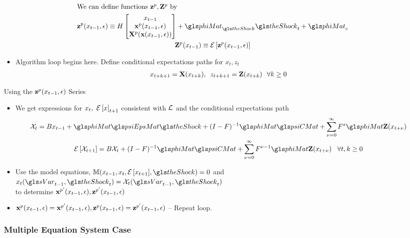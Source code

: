 \documentclass[12pt]{article}
\begin{document}
\begin{gather*}
 \intertext{We can define functions $\zpWOarg,\ZpWOarg$ by}
\zpWarg\equiv H
\begin{bmatrix}
x_{t-1}\\ \xpWarg\\ \XpWOarg(\xWarg)
\end{bmatrix}+\phiMat_\theShock \theShock_t+\phiMat_c\\
\ZpWOarg(x_{t-1})\equiv \expct{\zpWarg}
\end{gather*}
 \begin{itemize}
\item  {\color{blue}Algorithm loop begins here.} Define conditional expectations paths for $x_t, z_t$ 
 \begin{gather*}
 x_{t+k+1}=\mathbf{X}(x_{t+k}),\,\,\,z_{t+k+1}=\mathbf{Z}(x_{t+k})\,\,\,\,  \forall k\ge 0      \end{gather*}
   \end{itemize}

{Using the $\mathbf{z}^p(x_{t-1},\epsilon)$ Series}
{\small
  \begin{itemize}
  \item We get expressions for $x_t,\,\, {\mathcal{E}\left [ x \right ]}_{t+1}$ consistent with ${\mathcal{L}}$ and the conditional expectations path
   \begin{gather*}
     \mathcal{X}_{t} =B x_{t-1}+ \phiMat \psiEpsMat\theShock + (I - F)^{-1} \phiMat \psiCMat + \sum_{\sForSum=0}^\infty F^s \phiMat \ZWOarg(x_{t+\nu})\\
	\expct{ \mathcal{X}_{t+1}} =B \mathcal{X}_{t}  + (I - F)^{-1} \phiMat \psiCMat+ \sum_{\sForSum =0}^\infty F^{\sForSum-1} \phiMat \ZWOarg(x_{t+\nu}) \,\,\,\,\,\forall t,k \ge  0
\end{gather*}
\item Use the model equations, $\eqnFunc(x_{t-1},x_t,\expct{x_{t+1}},\theShock)=0$ and $x_t\tArg=\mathcal{X}_t\tArg$\\ to determine $\mathbf{x}^{p'}(x_{t-1},\epsilon), \mathbf{z}^{p'}(x_{t-1},\epsilon)$
\item $\mathbf{x}^p(x_{t-1},\epsilon)=\mathbf{x}^{p'}(x_{t-1},\epsilon), \mathbf{z}^p(x_{t-1},\epsilon)=\mathbf{z}^{p'}(x_{t-1},\epsilon)$ -- {\color{blue}Repeat loop.}
  \end{itemize}
}

\subsubsection{Multiple Equation System Case}
\end{document}
